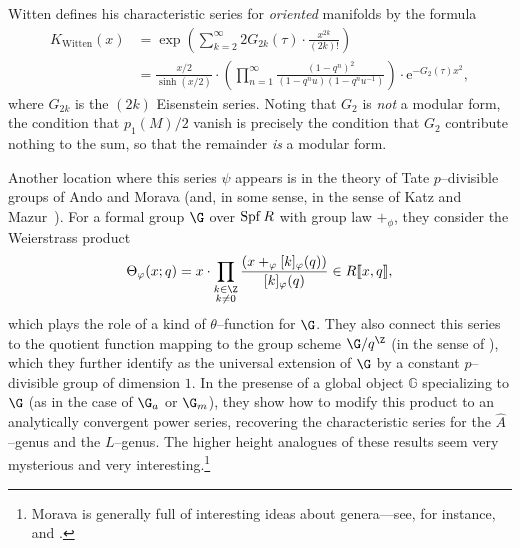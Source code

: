 \begin{remark}
Witten defines his characteristic series for \emph{oriented} manifolds by the formula
\begin{align*}
K_{\mathrm{Witten}}(x) & = \exp\left( \sum_{k=2}^\infty 2 G_{2k}(\tau) \cdot \frac{x^{2k}}{(2k)!} \right) \\
& = \frac{x/2}{\sinh(x/2)} \cdot \left(\prod_{n=1}^\infty \frac{(1 - q^n)^2}{(1 - q^n u)(1 - q^n u^{-1})}\right) \cdot \mathrm e^{-G_2(\tau) x^2},
\end{align*}
where \(G_{2k}\) is the \((2k)\){\th} Eisenstein series.  Noting that \(G_2\) is \emph{not} a modular form, the condition that \(p_1(M) / 2\) vanish is precisely the condition that \(G_2\) contribute nothing to the sum, so that the remainder \emph{is} a modular form.
\end{remark}

\begin{remark}
Another location where this series \(\psi\) appears is in the theory of Tate \(p\)--divisible groups of Ando and Morava (and, in some sense, in the sense of Katz and Mazur~\cite[Sections 8.7--8]{KatzMazur}).  For a formal group \(\G\) over \(\operatorname{Spf} R\) with group law \(+_\phi\), they consider the Weierstrass product \[\Theta_{\phi}(x; q) = x \cdot \prod_{\substack{k \in \Z \\ k \ne 0}} \frac{(x +_\phi [k]_\phi(q))}{[k]_\phi(q)} \in R\ps{x,q},\] which plays the role of a kind of \(\theta\)--function for \(\G\).  They also connect this series to the quotient function mapping to the group scheme \(\G / q^{\Z}\) (in the sense of ), which they further identify as the universal extension of \(\G\) by a constant \(p\)--divisible group of dimension \(1\).  In the presense of a global object \(\mathbb G\) specializing to \(\G\) (as in the case of \(\G_a\) or \(\G_m\)), they show how to modify this product to an analytically convergent power series, recovering the characteristic series for the \(\widehat A\)--genus and the \(L\)--genus.  The higher height analogues of these results seem very mysterious and very interesting.\footnote{Morava is generally full of interesting ideas about genera---see, for instance,~\cite{MoravaMotivicThomIso} and \cite{MoravaTHH}.}
\end{remark}

